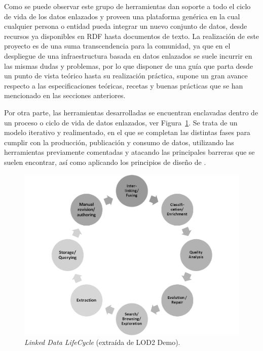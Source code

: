 % 


Como se puede observar este grupo de herramientas dan soporte a todo el ciclo de vida de los datos enlazados y proveen
una plataforma genérica en la cual cualquier persona o entidad pueda integrar un nuevo conjunto de datos, desde
recursos ya disponibles en \gls{RDF} hasta documentos de texto. La realización de este proyecto es de una suma transcendencia
para la comunidad, ya que en el despliegue de una infraestructura basada en datos enlazados se suele incurrir en las mismas
dudas y problemas, por lo que disponer de una guía que parta desde un punto de vista teórico hasta su realización práctica, 
supone un gran avance respecto a las especificaciones teóricas, recetas y buenas prácticas que se han mencionado en las
secciones anteriores. 

Por otra parte, las herramientas desarrolladas se encuentran enclavadas dentro de un proceso o ciclo de vida de datos enlazados,
ver Figura~\ref{fig:lod-lifecycle}. Se trata de un modelo iterativo y realimentado, en el que se completan las distintas fases
para cumplir con la producción, publicación y consumo de datos, utilizando las herramientas previamente comentadas y atacando
las principales barreras que se suelen encontrar, así como aplicando los principios de diseño de \linkeddata.

\begin{figure}[!htb]
\centering
	\includegraphics[width=12cm]{images/phd/lod-lifecycle-small}
\caption{\textit{Linked Data LifeCycle} (extraída de LOD2 Demo).}
\label{fig:lod-lifecycle}
\end{figure}

